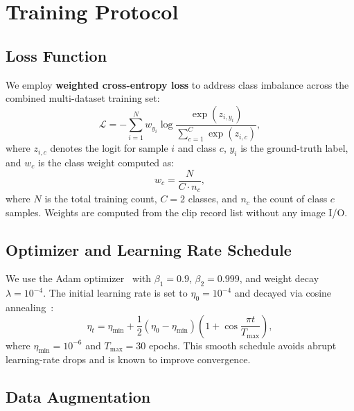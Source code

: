 \documentclass[journal]{IEEEtran}
\begin{document}
\section{Training Protocol}
\label{sec:training}

\subsection{Loss Function}
\label{sec:loss}

We employ \textbf{weighted cross-entropy loss} to address class imbalance across the combined multi-dataset training set:
\begin{equation}
\mathcal{L} = -\sum_{i=1}^{N} w_{y_i} \log \frac{\exp(z_{i, y_i})}{\sum_{c=1}^{C} \exp(z_{i,c})},
\end{equation}
where $z_{i,c}$ denotes the logit for sample $i$ and class $c$, $y_i$ is the ground-truth label, and $w_c$ is the class weight computed as:
\begin{equation}
w_c = \frac{N}{C \cdot n_c},
\end{equation}
where $N$ is the total training count, $C{=}2$ classes, and $n_c$ the count of class $c$ samples. Weights are computed from the clip record list without any image I/O.

\subsection{Optimizer and Learning Rate Schedule}
\label{sec:optimizer}

We use the Adam optimizer~\cite{kingma2015} with $\beta_1{=}0.9$, $\beta_2{=}0.999$, and weight decay $\lambda{=}10^{-4}$. The initial learning rate is set to $\eta_0 = 10^{-4}$ and decayed via cosine annealing~\cite{loshchilov2017}:
\begin{equation}
\eta_t = \eta_{\min} + \frac{1}{2}(\eta_0 - \eta_{\min})\left(1 + \cos\frac{\pi t}{T_{\max}}\right),
\end{equation}
where $\eta_{\min} = 10^{-6}$ and $T_{\max} = 30$ epochs. This smooth schedule avoids abrupt learning-rate drops and is known to improve convergence.

\subsection{Data Augmentation}
\label{sec:augmentation}
\end{document}
